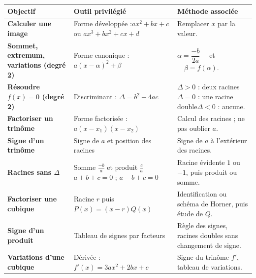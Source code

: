\begin{center}
	\def\arraystretch{1.5}
	\begin{tabular}{|m{4.5cm}|m{5.5cm}|m{5.7cm}|} \hline
		\ccg \textbf{Objectif}                          & \cc{bleuClair} \textbf{Outil privilégié}                                    & \cc{vertClair} \textbf{Méthode associée}                                                      \\ \hline
		\textbf{Calculer une image}                     & Forme développée :\newline $ax^2+bx+c$ ou $ax^3+bx^2+cx+d$                  & Remplacer $x$ par la valeur.                                                                  \\ \hline
		\textbf{Sommet, extremum, variations (degré 2)} & Forme canonique : $a(x-\alpha)^2+\beta$                                     & $\alpha = \dfrac{-b}{2a}\quad$ et $\quad\beta = f(\alpha)$.                                   \\ \hline
		\textbf{Résoudre $f(x)=0$ (degré 2)}            & Discriminant : $\Delta = b^2-4ac$                                           & $\Delta>0$ : deux racines\newline $\Delta=0$ : une racine double\newline $\Delta<0$ : aucune. \\ \hline
		\textbf{Factoriser un trinôme}                  & Forme factorisée : $a(x-x_1)(x-x_2)$                                        & Calcul des racines ; ne pas oublier $a$.                                                      \\ \hline
		\textbf{Signe d'un trinôme}                     & Signe de $a$ et position des racines                                        & Signe de $a$ à l'extérieur des racines.                                                       \\ \hline
		\textbf{Racines sans $\Delta$}                  & Somme $\frac{-b}{a}$ et produit $\frac{c}{a}$\newline $a+b+c=0$ ; $a-b+c=0$ & Racine évidente $1$ ou $-1$, puis produit ou somme.                                           \\ \hline
		\textbf{Factoriser une cubique}                 & Racine $r$ puis $P(x)=(x-r)Q(x)$                                            & Identification ou schéma de Horner, puis étude de $Q$.                                        \\ \hline
		\textbf{Signe d'un produit}                     & Tableau de signes par facteurs                                              & Règle des signes, racines doubles sans changement de signe.                                   \\ \hline
		\textbf{Variations d'une cubique}               & Dérivée : $f'(x) = 3ax^2+2bx+c$                                             & Signe du trinôme $f'$, tableau de variations.                                                 \\ \hline
	\end{tabular}
\end{center}

